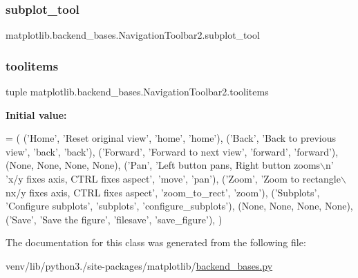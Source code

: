 \subsubsection{\texorpdfstring{subplot\+\_\+tool}{subplot\_tool}}
{\footnotesize\ttfamily matplotlib.\+backend\+\_\+bases.\+Navigation\+Toolbar2.\+subplot\+\_\+tool}

\mbox{\label{classmatplotlib_1_1backend__bases_1_1NavigationToolbar2_ae47f74ab4379c8c1b8655b166a5a6f59}} 
\subsubsection{\texorpdfstring{toolitems}{toolitems}}
{\footnotesize\ttfamily tuple matplotlib.\+backend\+\_\+bases.\+Navigation\+Toolbar2.\+toolitems\hspace{0.3cm}{\ttfamily [static]}}

{\bfseries Initial value\+:}
\begin{DoxyCode}
=  (
        (\textcolor{stringliteral}{'Home'}, \textcolor{stringliteral}{'Reset original view'}, \textcolor{stringliteral}{'home'}, \textcolor{stringliteral}{'home'}),
        (\textcolor{stringliteral}{'Back'}, \textcolor{stringliteral}{'Back to previous view'}, \textcolor{stringliteral}{'back'}, \textcolor{stringliteral}{'back'}),
        (\textcolor{stringliteral}{'Forward'}, \textcolor{stringliteral}{'Forward to next view'}, \textcolor{stringliteral}{'forward'}, \textcolor{stringliteral}{'forward'}),
        (\textcolor{keywordtype}{None}, \textcolor{keywordtype}{None}, \textcolor{keywordtype}{None}, \textcolor{keywordtype}{None}),
        (\textcolor{stringliteral}{'Pan'},
         \textcolor{stringliteral}{'Left button pans, Right button zooms\(\backslash\)n'}
         \textcolor{stringliteral}{'x/y fixes axis, CTRL fixes aspect'},
         \textcolor{stringliteral}{'move'}, \textcolor{stringliteral}{'pan'}),
        (\textcolor{stringliteral}{'Zoom'}, \textcolor{stringliteral}{'Zoom to rectangle\(\backslash\)nx/y fixes axis, CTRL fixes aspect'},
         \textcolor{stringliteral}{'zoom\_to\_rect'}, \textcolor{stringliteral}{'zoom'}),
        (\textcolor{stringliteral}{'Subplots'}, \textcolor{stringliteral}{'Configure subplots'}, \textcolor{stringliteral}{'subplots'}, \textcolor{stringliteral}{'configure\_subplots'}),
        (\textcolor{keywordtype}{None}, \textcolor{keywordtype}{None}, \textcolor{keywordtype}{None}, \textcolor{keywordtype}{None}),
        (\textcolor{stringliteral}{'Save'}, \textcolor{stringliteral}{'Save the figure'}, \textcolor{stringliteral}{'filesave'}, \textcolor{stringliteral}{'save\_figure'}),
      )
\end{DoxyCode}


The documentation for this class was generated from the following file\+:\begin{DoxyCompactItemize}
\item 
venv/lib/python3./site-\/packages/matplotlib/\hyperlink{backend__bases_8py}{backend\+\_\+bases.\+py}\end{DoxyCompactItemize}
